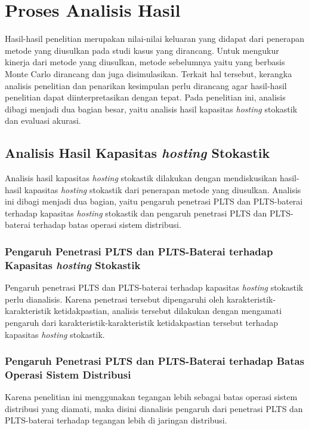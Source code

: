 {\section{Proses Analisis Hasil}
Hasil-hasil penelitian merupakan nilai-nilai keluaran yang didapat dari penerapan metode yang diusulkan pada studi kasus yang dirancang. Untuk mengukur kinerja dari metode yang diusulkan, metode sebelumnya yaitu yang berbasis Monte Carlo dirancang dan juga disimulasikan. Terkait hal tersebut, kerangka analisis penelitian dan penarikan kesimpulan perlu dirancang agar hasil-hasil penelitian dapat diinterpretasikan dengan tepat. Pada penelitian ini, analisis dibagi menjadi dua bagian besar, yaitu analisis hasil kapasitas \textit{\textit{hosting}} stokastik dan evaluasi akurasi. 

\subsection{Analisis Hasil Kapasitas \textit{\textit{hosting}} Stokastik}
Analisis hasil kapasitas \textit{\textit{hosting}} stokastik dilakukan dengan mendiskusikan hasil-hasil kapasitas \textit{\textit{hosting}} stokastik dari penerapan metode yang diusulkan. Analisis ini dibagi menjadi dua bagian, yaitu pengaruh penetrasi PLTS dan PLTS-baterai terhadap kapasitas \textit{\textit{hosting}} stokastik dan pengaruh penetrasi PLTS dan PLTS-baterai terhadap batas operasi sistem distribusi.
\subsubsection{Pengaruh Penetrasi PLTS dan PLTS-Baterai terhadap Kapasitas \textit{\textit{hosting}} Stokastik}
Pengaruh penetrasi PLTS dan PLTS-baterai terhadap kapasitas \textit{\textit{hosting}} stokastik perlu dianalisis. Karena penetrasi tersebut dipengaruhi oleh karakteristik-karakteristik ketidakpastian, analisis tersebut dilakukan dengan mengamati pengaruh dari karakteristik-karakteristik ketidakpastian tersebut terhadap kapasitas \textit{\textit{hosting}} stokastik.

\subsubsection{Pengaruh Penetrasi PLTS dan PLTS-Baterai terhadap Batas Operasi Sistem Distribusi}
Karena penelitian ini menggunakan tegangan lebih sebagai batas operasi sistem distribusi yang diamati, maka disini dianalisis pengaruh dari penetrasi PLTS dan PLTS-baterai terhadap tegangan lebih di jaringan distribusi.
}
